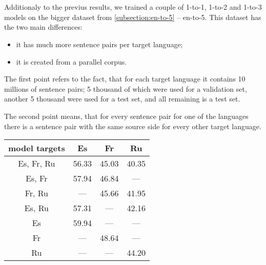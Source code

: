 \cleardoublepage

\section{}

Additionaly to the previus results, we trained a couple of
1-to-1, 1-to-2 and 1-to-3 models on the bigger dataset from
\cref{subsection:en-to-5} -- \gls{en-to-5}.
This dataset has the two main differences:
\begin{itemize}
	\item it has much more sentence pairs per target language;
	\item it is created from a parallel corpus.
\end{itemize}

The first point refers to the fact, that for each target language
it contains 10 millions of sentence pairs; 5 thousand of which
were used for a validation set, another 5 thousand were used
for a test set, and all remaining is a test set.

The second point means, that for every sentence pair for
one of the languages there is a sentence pair with the same
source side for every other target language.


\begin{table}[h]
\centering
\begin{tabular}{c|ccc}
\toprule
	model targets &    Es &    Fr &    Ru \\
\midrule
	Es, Fr, Ru    & 56.33 & 45.03 & 40.35 \\
\midrule
	Es, Fr        & 57.94 & 46.84 &  ---  \\
	Fr, Ru        &  ---  & 45.66 & 41.95 \\
	Es, Ru        & 57.31 &  ---  & 42.16 \\
\midrule
	Es            & 59.94 &  ---  &  ---  \\
	Fr            &  ---  & 48.64 &  ---  \\
	Ru            &  ---  &  ---  & 44.20 \\
\bottomrule
\end{tabular}
\label{table:un_results}
\end{table}
